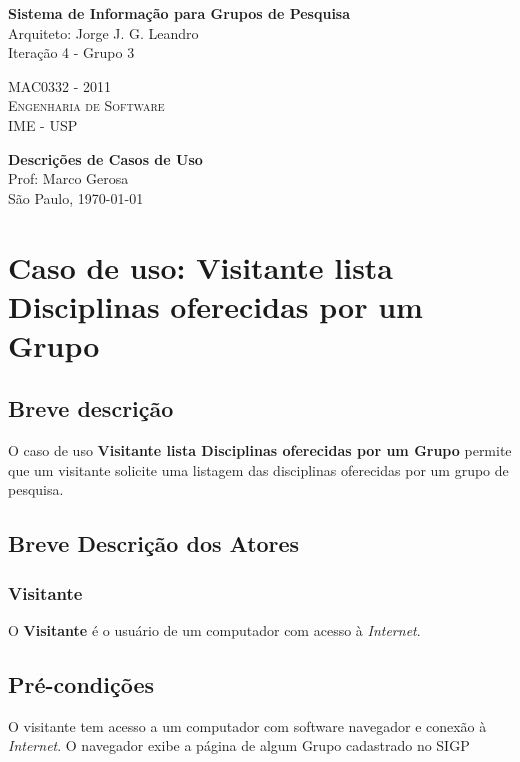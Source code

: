 \documentclass[11pt, a4paper,oneside]{book}
\begin{document}
\thispagestyle{empty}
\begin{center}
    \vspace*{0.2cm}
    \textbf{\Large{Sistema de Informação para Grupos de Pesquisa}}\\
	
    \vspace*{1.2cm}
    \Large{Arquiteto: Jorge J. G. Leandro}\\
    \Large{Iteração 4 - Grupo 3}
    
    \vskip 2cm
	\textsc{
	MAC0332 - 2011\\[-0.25cm] 
          	Engenharia de Software\\[-0.25cm] 	
	IME - USP\\[-0.25cm]
	}
    
    \vskip 1.5cm
    \textbf{Descrições de Casos de Uso}\\
    Prof: Marco Gerosa\\

	
    \vskip 0.5cm
   {\normalsize São Paulo, \today}
\end{center}


\chapter[Caso de Uso]{Caso de uso: \bf Visitante lista Disciplinas oferecidas por um Grupo}
\label{cap:casodeuso}	

\section{Breve descrição}

O caso de uso \textbf{Visitante lista Disciplinas oferecidas por um Grupo} permite que um visitante solicite uma listagem das disciplinas oferecidas por um grupo de pesquisa.

\section{Breve Descrição dos Atores}

\subsection{Visitante}

O \textbf{Visitante} é o usuário de um computador com acesso à \emph{Internet}.

\section{Pré-condições}
O visitante tem acesso a um computador com software navegador e conexão à \emph{Internet}.
O navegador exibe a página de algum Grupo cadastrado no SIGP
\end{document}
